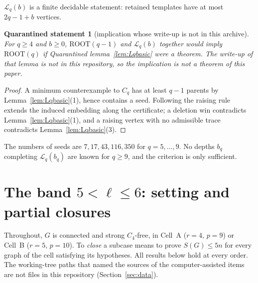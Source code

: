 \documentclass[11pt]{amsart}
\newtheorem{qrecord}[theorem]{Quarantined statement}
\theoremstyle{definition}
\theoremstyle{remark}
\newcommand{\lr}{\ell}
\newcommand{\pp}{p}
\newcommand{\ROOT}{\mathrm{ROOT}}
\begin{document}
$\mathcal L_q(b)$ is a finite decidable statement: retained templates have at most $2q-1+b$ vertices.

\begin{qrecord}[implication whose write-up is not in this archive]\label{thm:Lq}
For $q\ge4$ and $b\ge0$, $\ROOT(q-1)$ and $\mathcal L_q(b)$ together would imply $\ROOT(q)$ if Quarantined lemma~\ref{lem:Lqbasic} were a theorem. The write-up of that lemma is not in this repository, so the implication is not a theorem of this paper.
\end{qrecord}

\begin{proof}
A minimum counterexample to $C_q$ has at least $q-1$ parents by Lemma~\ref{lem:Lqbasic}(1), hence contains a seed. Following the raising rule extends the induced embedding along the certificate; a deletion win contradicts Lemma~\ref{lem:Lqbasic}(1), and a raising vertex with no admissible trace contradicts Lemma~\ref{lem:Lqbasic}(3).
\end{proof}

The numbers of seeds are $7,17,43,116,350$ for $q=5,\dots,9$. No depths $b_q$ completing $\mathcal L_q(b_q)$ are known for $q\ge9$, and the criterion is only sufficient.

\section{The band \texorpdfstring{$5<\lr\le6$}{5<l<=6}: setting and partial closures}\label{app:cells}

Throughout, $G$ is connected and strong $C_4$-free, in Cell~A ($r=4$, $\pp=9$) or Cell~B ($r=5$, $\pp=10$). To \emph{close} a subcase means to prove $S(G)\le5n$ for every graph of the cell satisfying its hypotheses. All results below hold at every order. The working-tree paths that named the sources of the computer-assisted items are not files in this repository (Section~\ref{sec:data}).
\end{document}
